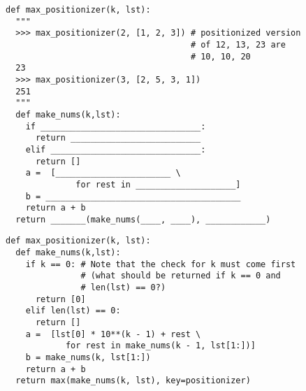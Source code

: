 \begin{parts}
\begin{lstlisting}
def max_positionizer(k, lst):
  """
  >>> max_positionizer(2, [1, 2, 3]) # positionized version 
                                     # of 12, 13, 23 are 
                                     # 10, 10, 20 
  23
  >>> max_positionizer(3, [2, 5, 3, 1])
  251
  """
  def make_nums(k,lst):
    if ________________________________:
      return __________________________
    elif ______________________________:
      return []
    a =  [_______________________ \
              for rest in ____________________]
    b = _______________________________________
    return a + b
  return _______(make_nums(____, ____), ____________)
\end{lstlisting}
\begin{solution}
\begin{lstlisting}
def max_positionizer(k, lst):
  def make_nums(k,lst):
    if k == 0: # Note that the check for k must come first 
               # (what should be returned if k == 0 and 
               # len(lst) == 0?)
      return [0]
    elif len(lst) == 0:
      return []
    a =  [lst[0] * 10**(k - 1) + rest \
            for rest in make_nums(k - 1, lst[1:])]
    b = make_nums(k, lst[1:])
    return a + b
  return max(make_nums(k, lst), key=positionizer)
\end{lstlisting}
\end{solution}
\end{parts}